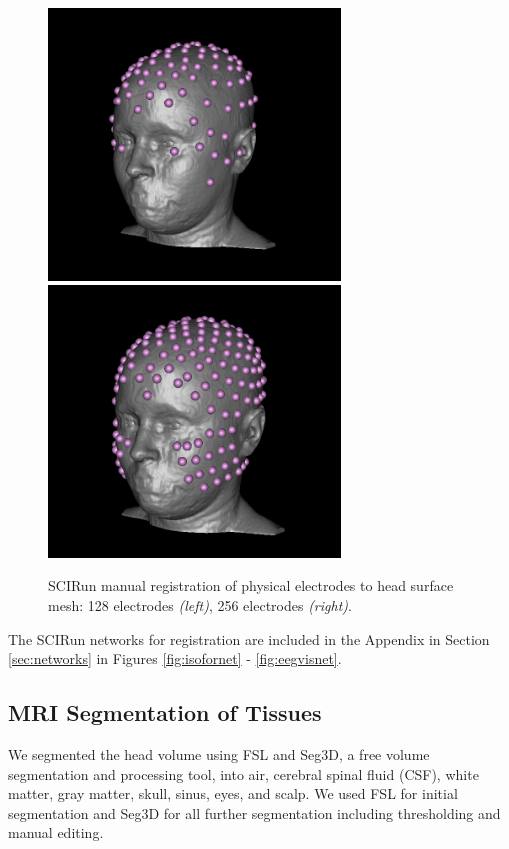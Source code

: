 \begin{figure}[H]
\begin{center}
\includegraphics[height = 2.84in]{Figures/128_eeg_reg}
\includegraphics[height = 2.84in]{Figures/256_eeg_reg}
\caption{SCIRun manual registration of physical electrodes to head surface mesh: 128 electrodes \textit{(left)}, 256 electrodes \textit{(right)}.}
\label{fig:eegreg}
\end{center}
\end{figure}

The SCIRun networks for registration are included in the Appendix in Section \ref{sec:networks} in Figures \ref{fig:isofornet} - \ref{fig:eegvisnet}.

\subsection{MRI Segmentation of Tissues}
\label{sec:Seg}


We segmented the head volume using FSL and Seg3D, a free volume segmentation and processing tool, \cite{ref:seg3d} into air, cerebral spinal fluid (CSF), white matter, gray matter, skull, sinus, eyes, and scalp. We used FSL for initial segmentation and Seg3D for all further segmentation including thresholding and manual editing.

